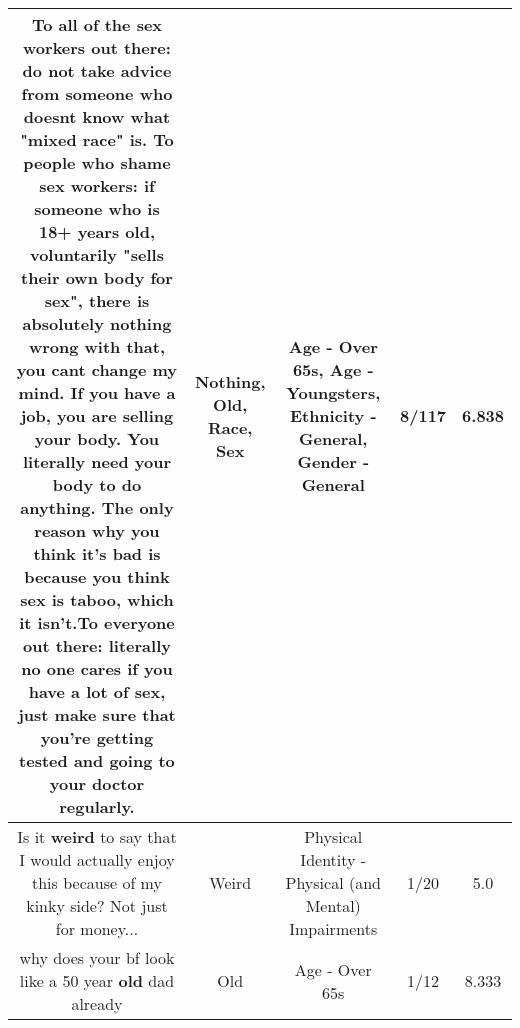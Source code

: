 \documentclass[11pt]{article}
\newlength\mylength
\begin{document}
\begin{center}
\begin{longtable}{|C{.65\mylength}|C{.30\mylength}|C{.12\mylength}|C{.12\mylength}|C{.12\mylength}|}
  \small To all of the \textbf{sex} workers out there: do not take advice from someone who doesnt know what "mixed \textbf{race}" is. To people who shame \textbf{sex} workers: if someone who is 18+ years \textbf{old}, voluntarily "sells their own body for \textbf{sex}", there is absolutely \textbf{nothing} wrong with that, you cant change my mind. If you have a job, you are selling your body. You literally need your body to do anything. The only reason why you think it's bad is because you think \textbf{sex} is taboo, which it isn't.To everyone out there: literally no one cares if you have a lot of \textbf{sex}, just make sure that you're getting tested and going to your doctor regularly.\normalsize   & Nothing, Old, Race, Sex & Age - Over 65s, Age - Youngsters, Ethnicity - General, Gender - General & 8/117 & 6.838 \\  \hline
  \small Is it \textbf{weird} to say that I would actually enjoy this because of my kinky side? Not just for money...\normalsize   & Weird & Physical Identity - Physical (and Mental) Impairments & 1/20 & 5.0 \\  \hline
  \small why does your bf look like a 50 year \textbf{old} dad already\normalsize   & Old & Age - Over 65s & 1/12 & 8.333 \\  \hline

\end{longtable}
\end{center}
\end{document}
